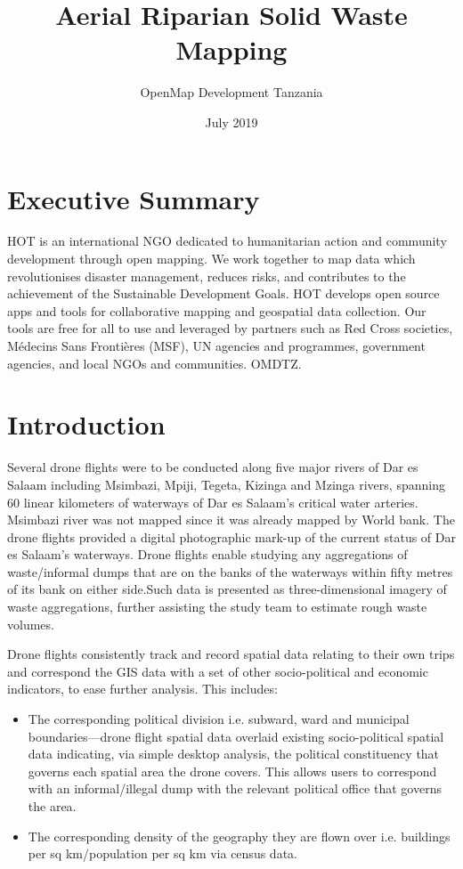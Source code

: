\documentclass[a4paper,12pt,twoside]{article}
\title{Aerial Riparian Solid Waste Mapping}
\author{OpenMap Development Tanzania}
\date{July 2019}
\begin{document}
\maketitle

\newpage
\tableofcontents

\newpage
\section{Executive Summary}
\begin{multicols}{2}
HOT is an international NGO dedicated to humanitarian action and community development through open mapping. We work together to map data which revolutionises disaster management, reduces risks, and contributes to the achievement of the Sustainable Development Goals.
HOT develops open source apps and tools for collaborative mapping and geospatial data collection. Our tools are free for all to use and leveraged by partners such as Red Cross societies, Médecins Sans Frontières (MSF), UN agencies and programmes, government agencies, and local NGOs and communities.
OMDTZ.

\end{multicols}

\section{Introduction}

Several drone flights were to be  conducted along five major rivers of Dar es Salaam including  Msimbazi, Mpiji, Tegeta, Kizinga and Mzinga rivers, spanning 60 linear kilometers of waterways of Dar es Salaam’s critical water arteries. Msimbazi river was not mapped since it  was  already mapped by World bank. The drone flights provided a digital photographic mark-up of the current status of Dar es Salaam’s waterways.   
Drone flights enable studying any aggregations of waste/informal dumps that are on the banks of the waterways within fifty metres of its bank on either side.Such data is presented as three-dimensional imagery of waste aggregations, further assisting the study team to estimate rough waste volumes.

Drone flights consistently track and record spatial data relating to their own trips and correspond the GIS data with a set of other socio-political and economic indicators, to ease further analysis. This includes:   

\begin{itemize}
    \item The corresponding political division i.e. subward, ward and municipal boundaries—drone flight spatial data overlaid existing socio-political spatial data indicating, via simple desktop analysis, the political constituency that governs each spatial area the drone covers. This allows users to correspond with an informal/illegal dump with the relevant political office that governs the area.
    \item The corresponding density of the geography they are flown over i.e. buildings per sq km/population per sq km via census data. 
\end{itemize}
\end{document}
